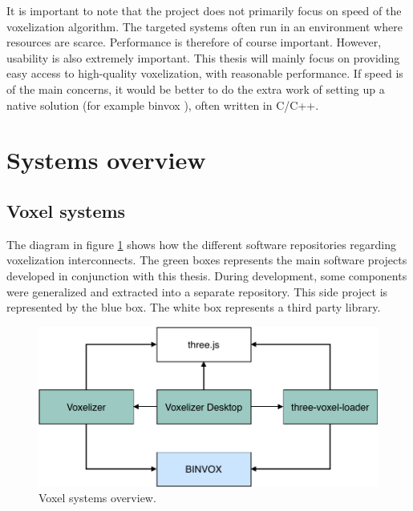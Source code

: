It is important to note that the project does not primarily focus on speed of the voxelization algorithm. The targeted systems often run in an environment where resources are scarce. Performance is therefore of course important. However, usability is also extremely important. This thesis will mainly focus on providing easy access to high-quality voxelization, with reasonable performance. If speed is of the main concerns, it would be better to do the extra work of setting up a native solution (for example binvox \cite{binvox}), often written in C/C++.

\section{Systems overview}
\subsection{Voxel systems}
The diagram in figure \ref{fig:voxel-systems-overview} shows how the different software repositories regarding voxelization interconnects. The green boxes represents the main software projects developed in conjunction with this thesis. During development, some components were generalized and extracted into a separate repository. This side project is represented by the blue box. The white box represents a third party library.
\begin{figure}[ht]
    \centering
    \includegraphics[page=1,scale=0.85]{sections/introduction/figures/voxel-systems-overview.pdf}
    \caption{Voxel systems overview.}
    \label{fig:voxel-systems-overview}
\end{figure}

